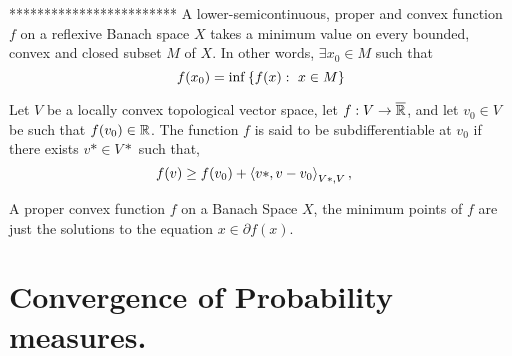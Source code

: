 ************************
A  lower-semicontinuous, proper and convex function $f$ on a reflexive Banach space $X$ takes a minimum value on every bounded, convex and closed subset $M$ of $X$. In other words, $\exists x_0 \in M$ such that
\begin{equation}
f(x_0)=\inf\left\lbrace f(x):\ x\in M \right\rbrace
\end{equation}
\begin{definition}
	Let $V$ be a locally convex topological vector space, let $f:
	V\rightarrow\overline{\mathbb{R}}$, and let $v_0 \in V$ be such that $f(v_0)\in\mathbb{R}$. The function $f$ is said to be subdifferentiable at $v_0$ if there exists $v*\in V*$ such that,
	\begin{equation}
	f(v)\geq f(v_0)+\left\langle v*, v-v_0 \right\rangle_{V*,V}, \quad 
	\end{equation} 
\end{definition}

A proper convex function $f$ on a Banach Space $X$, the minimum points of $f$ are just the solutions to the equation  $x\in\partial f(x)$.





\section{Convergence of Probability measures.}

